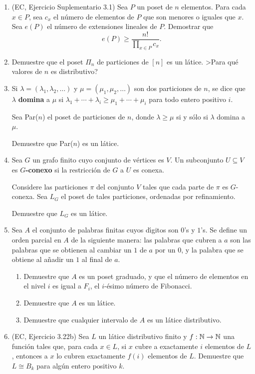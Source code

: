 \documentclass[letterpaper,10pt]{article}
\begin{document}
\begin{enumerate}


\item (EC, Ejercicio Suplementario 3.1) Sea $P$ un poset de $n$
elementos. Para cada $x \in P$, sea $c_x$ el n\'{u}mero de
elementos de $P$ que son menores o iguales que $x$. Sea $e(P)$ el
n\'{u}mero de extensiones lineales de $P$. Demostrar que
$$
e(P) \geq \frac{n!}{\prod_{x \in P} c_x}.
$$

\item Demuestre que el poset $\Pi_n$ de particiones de $[n]$ es un
l\'{a}tice. >Para qu\'{e} valores de $n$ es distributivo?

\item Si $\lambda = (\lambda_1, \lambda_2, \ldots)$ y $\mu =
(\mu_1, \mu_2, \ldots)$ son dos particiones de $n$, se dice que
$\lambda$ {\bf domina} a $\mu$ si $\lambda_1 + \cdots + \lambda_i
\geq \mu_1 + \cdots + \mu_i$ para todo entero positivo $i$.

Sea Par($n$) el poset de particiones de $n$, donde $\lambda \geq
\mu$ si y s\'{o}lo si $\lambda$ domina a $\mu$.

Demuestre que Par($n$) es un l\' {a}tice.

\item Sea $G$ un grafo finito cuyo conjunto de v\'{e}rtices es
$V$. Un subconjunto $U \subseteq V$ es {\bf $G$-conexo} si la
restricci\'{o}n de $G$ a $U$ es conexa.

Considere las particiones $\pi$ del conjunto $V$ tales que cada
parte de $\pi$ es $G$-conexa. Sea $L_G$ el poset de tales
particiones, ordenadas por refinamiento.

Demuestre que $L_G$ es un l\'{a}tice.

\item Sea $A$ el conjunto de palabras finitas cuyos d\'{\i}gitos
son $0$'s y $1$'s. Se define un orden parcial en $A$ de la
siguiente manera: las palabras que cubren a $a$ son las palabras
que se obtienen al cambiar un $1$ de $a$ por un $0$, y la palabra
que se obtiene al a\~{n}adir un $1$ al final de $a$.

\begin{enumerate}
\item Demuestre que $A$ es un poset graduado, y que el n\'{u}mero
de elementos en el nivel $i$ es igual a $F_i$, el $i$-\'{e}simo
n\'{u}mero de Fibonacci.

\item Demuestre que $A$ es un l\'{a}tice.

\item Demuestre que cualquier intervalo de $A$ es un l\'{a}tice
distributivo.
\end{enumerate}

\item (EC, Ejercicio 3.22b) Sea $L$ un l\'{a}tice distributivo
finito y $f:\Bbb N \rightarrow \Bbb N$ una funci\'{o}n tales que,
para cada $x \in L$, si $x$ cubre a exactamente $i$ elementos de
$L$, entonces a $x$ lo cubren exactamente $f(i)$ elementos de $L$.
Demuestre que $L \cong B_k$ para alg\'{u}n entero positivo $k$.


\end{enumerate}

\end{document}

